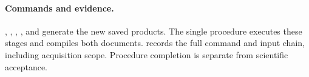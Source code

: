 \paragraph{Commands and evidence.}\begingroup\small\raggedright
{}, , , ,  and  generate the new saved products. The single procedure  executes these stages and compiles both documents.  records the full command and input chain, including acquisition scope. Procedure completion is separate from scientific acceptance.
\par\endgroup
